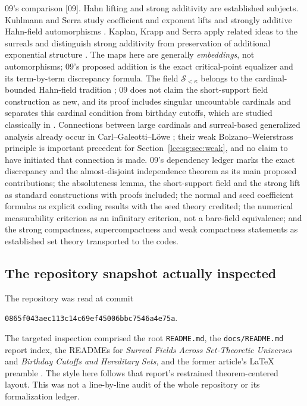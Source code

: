 \documentclass[11pt,letterpaper]{article}
\numberwithin{equation}{section}
\theoremstyle{definition}
\theoremstyle{remark}
\newcommand{\Sk}{\mathscr S_{<\kappa}}
\newcommand{\src}[1]{\textup{\textsf{\small[#1]}}}%
\begin{document}
09's comparison \src{09}. Hahn lifting and strong additivity are established
subjects. Kuhlmann and Serra study coefficient and exponent lifts and
strongly additive Hahn-field automorphisms \cite{KS}. Kaplan, Krapp and
Serra apply related ideas to the surreals and distinguish strong additivity
from preservation of additional exponential structure \cite{KKS}. The maps
here are generally \emph{embeddings}, not automorphisms; 09's proposed
addition is the exact critical-point equalizer and its term-by-term
discrepancy formula. The field $\Sk$ belongs to the cardinal-bounded
Hahn-field tradition \cite{KSh}; 09 does not claim the short-support field
construction as new, and its proof includes singular uncountable cardinals
and separates this cardinal condition from birthday cutoffs, which are
studied classically in \cite{vdDE}. Connections between large cardinals and
surreal-based generalized analysis already occur in
Carl--Galeotti--L\"owe \cite{CGL}; their weak Bolzano--Weierstrass principle
is important precedent for Section~\ref{lce:sg:sec:weak}, and no claim to
have initiated that connection is made. 09's dependency ledger marks the
exact discrepancy and the almost-disjoint independence theorem as its main
proposed contributions; the absoluteness lemma, the short-support field and
the strong lift as standard constructions with proofs included; the normal
and seed coefficient formulas as explicit coding results with the seed
theory credited; the numerical measurability criterion as an infinitary
criterion, not a bare-field equivalence; and the strong compactness,
supercompactness and weak compactness statements as established set theory
transported to the codes.

\subsection{The repository snapshot actually inspected}
The repository was read at commit
\begin{center}\small
\texttt{0865f043aec113c14c69ef45006bbc7546a4e75a}.
\end{center}
The targeted inspection comprised the root \texttt{README.md}, the
\texttt{docs/README.md} report index, the READMEs for
\emph{Surreal Fields Across Set-Theoretic Universes} and
\emph{Birthday Cutoffs and Hereditary Sets}, and the former article's
LaTeX preamble \cite{Repo,RepoUniverses,RepoBirthday}.
The style here follows that report's restrained theorem-centered layout.
This was not a line-by-line audit of the whole repository or its formalization
ledger.
\end{document}
